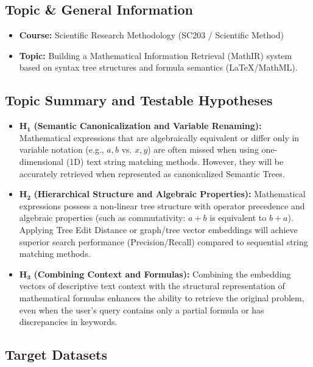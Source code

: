 \documentclass[11pt,a4paper]{article}
\begin{document}
\subsection{Topic \& General Information}
\begin{itemize}[leftmargin=1.5em]
    \item \textbf{Course:} Scientific Research Methodology (SC203 / Scientific Method)
    \item \textbf{Topic:} Building a Mathematical Information Retrieval (MathIR) system based on syntax tree structures and formula semantics (\LaTeX{}/MathML).
\end{itemize}

\subsection{Topic Summary and Testable Hypotheses}
\begin{itemize}[leftmargin=1.5em]
    \item $\mathbf{H_1}$ \textbf{(Semantic Canonicalization and Variable Renaming):} Mathematical expressions that are algebraically equivalent or differ only in variable notation (e.g., $a, b$ vs. $x, y$) are often missed when using one-dimensional (1D) text string matching methods. However, they will be accurately retrieved when represented as canonicalized Semantic Trees.
    \item $\mathbf{H_2}$ \textbf{(Hierarchical Structure and Algebraic Properties):} Mathematical expressions possess a non-linear tree structure with operator precedence and algebraic properties (such as commutativity: $a + b$ is equivalent to $b + a$). Applying Tree Edit Distance or graph/tree vector embeddings will achieve superior search performance (Precision/Recall) compared to sequential string matching methods.
    \item $\mathbf{H_3}$ \textbf{(Combining Context and Formulas):} Combining the embedding vectors of descriptive text context with the structural representation of mathematical formulas enhances the ability to retrieve the original problem, even when the user's query contains only a partial formula or has discrepancies in keywords.
\end{itemize}

\subsection{Target Datasets}
\end{document}
